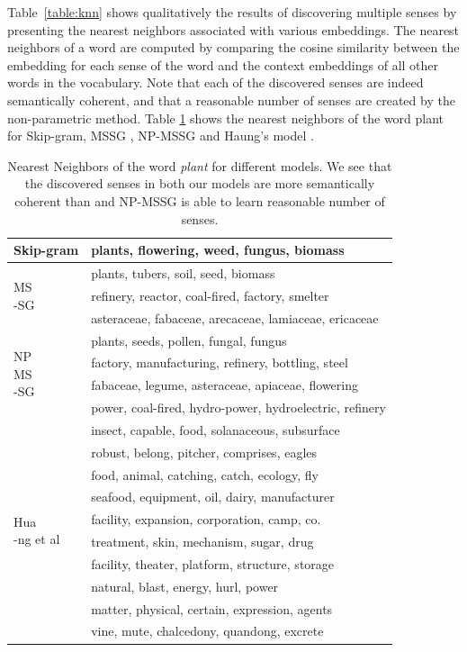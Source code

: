 \documentclass[11pt,a4paper]{article}
\begin{document}
Table~\ref{table:knn} shows qualitatively the results of discovering
multiple senses by presenting the nearest neighbors associated with
various embeddings.  The nearest neighbors of a word are computed by
comparing the cosine similarity between the embedding for each sense
of the word and the context embeddings of all other words in the
vocabulary.  Note that each of the discovered senses are indeed
semantically coherent, and that a reasonable number of senses are
created by the non-parametric method. Table \ref{table:knn-with-socher} shows the nearest neighbors of the word plant for Skip-gram, MSSG , NP-MSSG and Haung's model \cite{huang:2012}. 
\begin{table}[t!]
\small
\begin{tabular}{|p{0.7cm}|p{6.4cm}|}
 \hline
 Skip-gram  & plants, flowering, weed, fungus, biomass  \\  \hline
 \multirow{3}{*}{\parbox[t]{0.7cm}{MS\\-SG} } & plants, tubers, soil, seed, biomass \\
 & refinery, reactor, coal-fired, factory, smelter \\ 
 & asteraceae, fabaceae, arecaceae, lamiaceae, ericaceae\\ \hline
 \multirow{4}{*}{\parbox[t]{0.7cm}{NP\\MS\\-SG}} & plants, seeds,  pollen, fungal, fungus \\
 & factory,  manufacturing,  refinery, bottling, steel \\
 & fabaceae, legume, asteraceae, apiaceae, flowering  \\
 & power, coal-fired, hydro-power, hydroelectric, refinery \\ \hline
\multirow{10}{*}{\parbox[t]{0.7cm}{Hua\\-ng et al \\} } & insect, capable, food, solanaceous, subsurface \\ 
 & robust, belong, pitcher, comprises, eagles \\
 & food, animal, catching, catch, ecology, fly  \\
 & seafood, equipment, oil, dairy, manufacturer\\
 & facility,  expansion, corporation, camp, co. \\
 & treatment, skin, mechanism, sugar, drug \\
 & facility, theater, platform, structure, storage \\
 & natural, blast, energy, hurl, power \\
 & matter, physical, certain, expression, agents  \\
 & vine, mute, chalcedony, quandong,  excrete\\
\hline
\end{tabular}
\caption{Nearest Neighbors of the word {\it plant} for different models. We see that the discovered senses in both our models are more semantically coherent than  and NP-MSSG is able to learn reasonable number of senses.}
\label{table:knn-with-socher}
\end{table}
\end{document}

